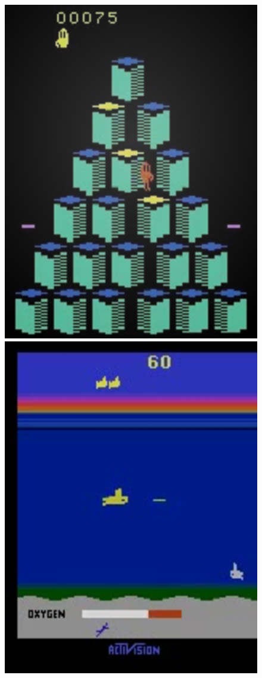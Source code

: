 \documentclass{article}
\begin{document}
    \begin{figure}[h]
        \centering
        \begin{minipage}{0.8\textwidth}
            \centering
            \includegraphics[scale=0.15]{Qbert}
            \centering
            \includegraphics[scale=0.15]{Seaquest}

\end{minipage}
\end{figure}
\end{document}
